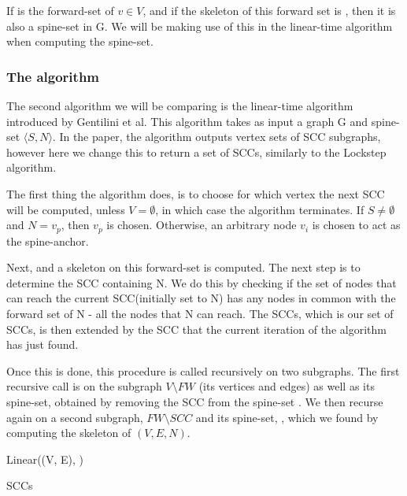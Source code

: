\documentclass[../master/master.tex]{subfiles}
\begin{document}
If  is the forward-set of $v \in V$, and if the skeleton of this forward set is , then it is also a spine-set in G. We will be making use of this in the linear-time algorithm when computing the spine-set.

\subsubsection{The algorithm}
The second algorithm we will be comparing is the linear-time algorithm \cite{linear} introduced by Gentilini et al. This algorithm takes as input a graph G and spine-set $\langle S, N\rangle$. In the paper, the algorithm outputs vertex sets of SCC subgraphs, however here we change this to return a set of SCCs, similarly to the Lockstep algorithm.

The first thing the algorithm does, is to choose for which vertex the next SCC will be computed, unless $V=\emptyset$, in which case the algorithm terminates. If $S\neq\emptyset$ and $N={v_p}$, then $v_p$ is chosen. Otherwise, an arbitrary node $v_i$ is chosen to act as the spine-anchor.

Next,  and a skeleton  on this forward-set is computed. The next step is to determine the SCC containing N. We do this by checking if the set of nodes that can reach the current SCC(initially set to N) has any nodes in common with the forward set of N - all the nodes that N can reach. The SCCs, which is our set of SCCs, is then extended by the SCC that the current iteration of the algorithm has just found.

Once this is done, this procedure is called recursively on two subgraphs. The first recursive call is on the subgraph $V\setminus FW$ (its vertices and edges) as well as its spine-set, obtained by removing the SCC from the spine-set . We then recurse again on a second subgraph, $FW\setminus SCC$ and its spine-set, , which we found by computing the skeleton of $(V, E, N)$.

\begin{algorithm}[H]
  \caption{Linear((V, E), )}
  \begin{algorithmic}[1]
     \State \Return
    \EndIf
    \Statex
    \EndIf
    \Statex
    \Statex
    \EndWhile
    \Statex
    \Statex
    \Statex
    \State \Return SCCs
  \end{algorithmic}
\end{algorithm}
\end{document}
